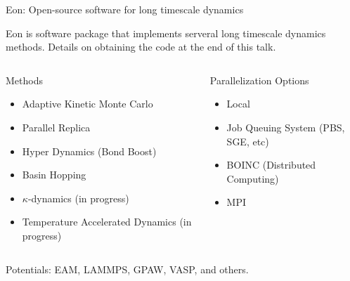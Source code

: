 \documentclass[onlymath]{beamer}
\begin{document}
\begin{frame}{Eon: Open-source software for long timescale dynamics}

  Eon is software package that implements serveral long
  timescale dynamics methods. Details on obtaining the code at the end of this talk.

  \vspace{5 mm}

  \begin{columns}[T]
    \begin{column}[l]{0.5\textwidth}

      Methods
      \begin{itemize}
        \item Adaptive Kinetic Monte Carlo
        \item Parallel Replica
        \item Hyper Dynamics (Bond Boost)
        \item Basin Hopping
        \item $\kappa$-dynamics (in progress)
        \item Temperature Accelerated Dynamics (in progress)
      \end{itemize}
    \end{column}
    \begin{column}[r]{0.5\textwidth}
      Parallelization Options
      \begin{itemize}
        \item Local
        \item Job Queuing System (PBS, SGE, etc)
        \item BOINC (Distributed Computing)
        \item MPI
      \end{itemize}

    \end{column}
  \end{columns}

  \vspace{5 mm}

  Potentials: EAM, LAMMPS, GPAW, VASP, and others.

\end{frame}
%
%
%
%
%
\end{document}
